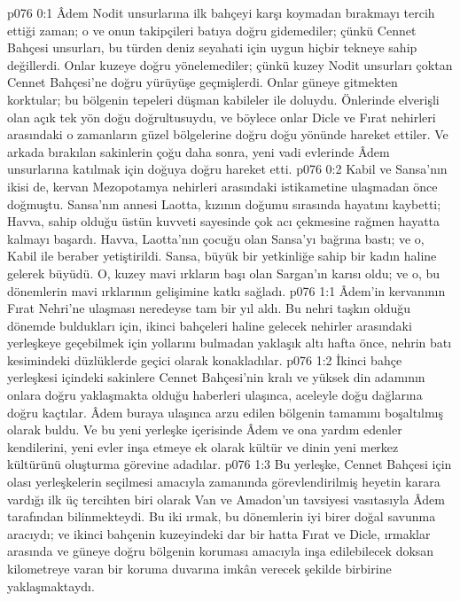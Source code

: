 \vs p076 0:1 Âdem Nodit unsurlarına ilk bahçeyi karşı koymadan bırakmayı tercih ettiği zaman; o ve onun takipçileri batıya doğru gidemediler; çünkü Cennet Bahçesi unsurları, bu türden deniz seyahati için uygun hiçbir tekneye sahip değillerdi. Onlar kuzeye doğru yönelemediler; çünkü kuzey Nodit unsurları çoktan Cennet Bahçesi’ne doğru yürüyüşe geçmişlerdi. Onlar güneye gitmekten korktular; bu bölgenin tepeleri düşman kabileler ile doluydu. Önlerinde elverişli olan açık tek yön doğu doğrultusuydu, ve böylece onlar Dicle ve Fırat nehirleri arasındaki o zamanların güzel bölgelerine doğru doğu yönünde hareket ettiler. Ve arkada bırakılan sakinlerin çoğu daha sonra, yeni vadi evlerinde Âdem unsurlarına katılmak için doğuya doğru hareket etti.
\vs p076 0:2 Kabil ve Sansa’nın ikisi de, kervan Mezopotamya nehirleri arasındaki istikametine ulaşmadan önce doğmuştu. Sansa’nın annesi Laotta, kızının doğumu sırasında hayatını kaybetti; Havva, sahip olduğu üstün kuvveti sayesinde çok acı çekmesine rağmen hayatta kalmayı başardı. Havva, Laotta’nın çocuğu olan Sansa’yı bağrına bastı; ve o, Kabil ile beraber yetiştirildi. Sansa, büyük bir yetkinliğe sahip bir kadın haline gelerek büyüdü. O, kuzey mavi ırkların başı olan Sargan’ın karısı oldu; ve o, bu dönemlerin mavi ırklarının gelişimine katkı sağladı.
\vs p076 1:1 Âdem’in kervanının Fırat Nehri’ne ulaşması neredeyse tam bir yıl aldı. Bu nehri taşkın olduğu dönemde buldukları için, ikinci bahçeleri haline gelecek nehirler arasındaki yerleşkeye geçebilmek için yollarını bulmadan yaklaşık altı hafta önce, nehrin batı kesimindeki düzlüklerde geçici olarak konakladılar.
\vs p076 1:2 İkinci bahçe yerleşkesi içindeki sakinlere Cennet Bahçesi’nin kralı ve yüksek din adamının onlara doğru yaklaşmakta olduğu haberleri ulaşınca, aceleyle doğu dağlarına doğru kaçtılar. Âdem buraya ulaşınca arzu edilen bölgenin tamamını boşaltılmış olarak buldu. Ve bu yeni yerleşke içerisinde Âdem ve ona yardım edenler kendilerini, yeni evler inşa etmeye ek olarak kültür ve dinin yeni merkez kültürünü oluşturma görevine adadılar.
\vs p076 1:3 Bu yerleşke, Cennet Bahçesi için olası yerleşkelerin seçilmesi amacıyla zamanında görevlendirilmiş heyetin karara vardığı ilk üç tercihten biri olarak Van ve Amadon’un tavsiyesi vasıtasıyla Âdem tarafından bilinmekteydi. Bu iki ırmak, bu dönemlerin iyi birer doğal savunma aracıydı; ve ikinci bahçenin kuzeyindeki dar bir hatta Fırat ve Dicle, ırmaklar arasında ve güneye doğru bölgenin koruması amacıyla inşa edilebilecek doksan kilometreye varan bir koruma duvarına imkân verecek şekilde birbirine yaklaşmaktaydı.
